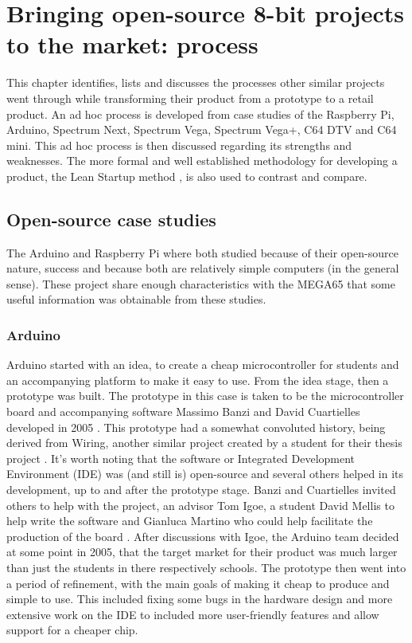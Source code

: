 
\chapter{Bringing open-source 8-bit projects to the market: process}
\label{Chapter4}

This chapter identifies, lists and discusses the processes other similar projects went through while transforming their product from a prototype to a retail product. An ad hoc process is developed from case studies of the Raspberry Pi, Arduino, Spectrum Next, Spectrum Vega, Spectrum Vega+, C64 DTV and C64 mini. This ad hoc process is then discussed regarding its strengths and weaknesses. The more formal and well established methodology for developing a product, the Lean Startup method 
\cite{136}, is also used to contrast and compare.
\section{Open-source case studies}
The Arduino and Raspberry Pi where both studied because of their open-source nature, success and because both are relatively simple computers (in the general sense). These project share enough characteristics with the MEGA65 that some useful information was obtainable from these studies.

\subsection{Arduino}
Arduino started with an idea, to create a cheap microcontroller for students and an accompanying platform to make it easy to use. From the idea stage, then a prototype was built. The prototype in this case is taken to be the microcontroller board and accompanying software Massimo Banzi and David Cuartielles developed in 2005 \cite{RN111}. This prototype had a somewhat convoluted history, being derived from Wiring, another similar project created by a student for their thesis project \cite{RN110}\cite{RN111}. It's worth noting that the software or Integrated Development Environment (IDE) was (and still is) open-source and several others helped in its development, up to and after the prototype stage. Banzi and Cuartielles invited others to help with the project, an advisor Tom Igoe, a student David Mellis to help write the software and Gianluca Martino who could help facilitate the production of the board 
\cite{RN111}. After discussions with Igoe, the Arduino team decided at some point in 2005, that the target market for their product was much larger than just the students in there respectively schools. The prototype then went into a period of refinement, with the main goals of making it cheap to produce and simple to use. This included fixing some bugs in the hardware design 
\cite{RN111} and more extensive work on the IDE to included more user-friendly features and allow support for a cheaper chip.

